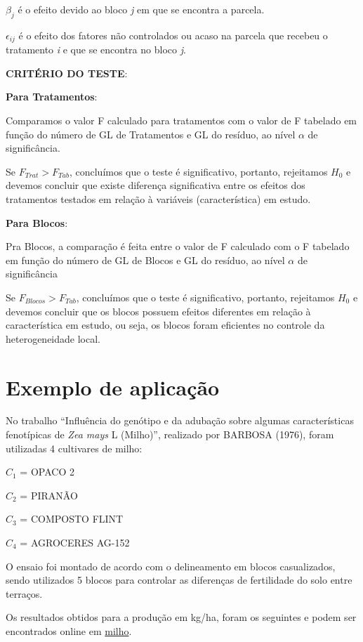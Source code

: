 \documentclass[
]{book}
\begin{document}
\(\beta_j\) é o efeito devido ao bloco \emph{j} em que se encontra a parcela.

\(\epsilon_{ij}\) é o efeito dos fatores não controlados ou acaso na parcela que recebeu o tratamento \emph{i} e que se encontra no bloco \emph{j}.

\textbf{CRITÉRIO DO TESTE}:

\textbf{Para Tratamentos}:

Comparamos o valor F calculado para tratamentos com o valor de F tabelado em função do número de GL de Tratamentos e GL do resíduo, ao nível \(\alpha\) de significância.

Se \(F_{Trat} > F_{Tab}\), concluímos que o teste é significativo, portanto, rejeitamos \(H_0\) e devemos concluir que existe diferença significativa entre os efeitos dos tratamentos testados em relação à variáveis (característica) em estudo.

\textbf{Para Blocos}:

Pra Blocos, a comparação é feita entre o valor de F calculado com o F tabelado em função do número de GL de Blocos e GL do resíduo, ao nível \(\alpha\) de significância

Se \(F_{Blocos} > F_{Tab}\), concluímos que o teste é significativo, portanto, rejeitamos \(H_0\) e devemos concluir que os blocos possuem efeitos diferentes em relação à característica em estudo, ou seja, os blocos foram eficientes no controle da heterogeneidade local.

\hypertarget{exemplo-de-aplicauxe7uxe3o-1}{%
\section{Exemplo de aplicação}\label{exemplo-de-aplicauxe7uxe3o-1}}

No trabalho ``Influência do genótipo e da adubação sobre algumas características fenotípicas de \emph{Zea mays} L (Milho)'', realizado por BARBOSA (1976), foram utilizadas 4 cultivares de milho:

\(C_1\) = OPACO 2

\(C_2\) = PIRANÃO

\(C_3\) = COMPOSTO FLINT

\(C_4\) = AGROCERES AG-152

O ensaio foi montado de acordo com o delineamento em blocos casualizados, sendo utilizados 5 blocos para controlar as diferenças de fertilidade do solo entre terraços.

Os resultados obtidos para a produção em kg/ha, foram os seguintes e podem ser encontrados online em \href{https://github.com/arpanosso/ExpAgr_2020/blob/master/dados/milho.txt}{milho}.
\end{document}
